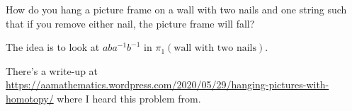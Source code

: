 \begin{problem}
	How do you hang a picture frame on a wall with two nails and one string
	such that if you remove either nail, the picture frame will fall?
	\begin{hint}
		The idea is to look at $aba^{-1}b^{-1}$ in $\pi_1(\text{wall with two nails})$.
	\end{hint}
	\begin{sol}
		There's a write-up at
		\url{https://aamathematics.wordpress.com/2020/05/29/hanging-pictures-with-homotopy/}
		where I heard this problem from.
	\end{sol}
\end{problem}
